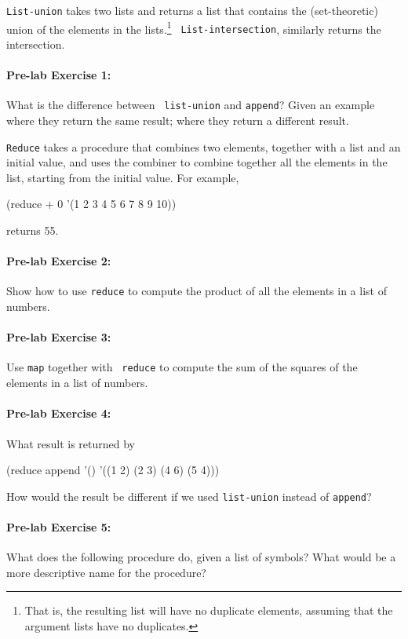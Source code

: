 {\tt List-union} takes two lists and returns a list that contains the
(set-theoretic) union of the elements in the lists.\footnote{That is,
the resulting list will have no duplicate elements, assuming that the
argument lists have no duplicates.}   {\tt
List-intersection}, similarly returns the intersection.

\paragraph{Pre-lab Exercise 1:} What is the difference between {\tt
list-union} and {\tt append}?  Given an example where they return the
same result; where they return a different result.


{\tt Reduce} takes a procedure that combines two elements, together
with a list and an initial value, and uses the combiner to combine
together all the elements in the list, starting from the initial
value.  For example,

\beginlisp
(reduce + 0 '(1 2 3 4 5 6 7 8 9 10))
\endlisp

\noindent
returns 55.

\paragraph{Pre-lab Exercise 2:} Show how to use {\tt reduce} to compute the
product of all the elements in a list of numbers.

\paragraph{Pre-lab Exercise 3:} Use {\tt map} together with {\tt
reduce} to compute the sum of the squares of the elements in a list of
numbers.

\paragraph{Pre-lab Exercise 4:} What result is returned by

\beginlisp
(reduce append '() '((1 2) (2 3) (4 6) (5 4)))
\endlisp

\noindent
How would the result be different if we used {\tt list-union} instead
of {\tt append}?

\paragraph{Pre-lab Exercise 5:} What does the following procedure do,
given a list of symbols?  What would be a more descriptive name for the
procedure?

